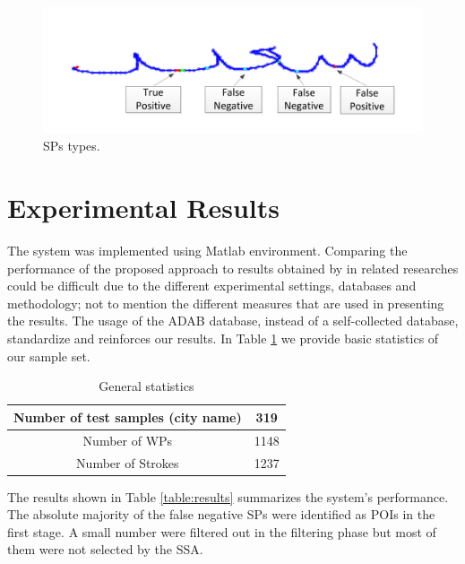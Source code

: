 \documentclass[10pt, conference, compsocconf]{IEEEtran}
\begin{document}
\begin{figure}
\centering
\includegraphics[width=0.8\columnwidth]{./figures/sp_types}
\caption{SPs types.}
\label{fig:sp_types}
\end{figure}

\section{Experimental Results}
\label{sec:results}
The system was implemented using Matlab environment. Comparing the performance of the proposed approach to results obtained by in related researches could be difficult due to the different experimental settings, databases and methodology; not to mention the different measures that are used in presenting the results. The usage of the ADAB database, instead of a self-collected database, standardize and reinforces our results. In Table \ref{table:general_stats} we provide basic statistics of our sample set.

\begin{table}[h]
\caption{General statistics}
\renewcommand{\arraystretch}{1.2}
\begin{tabular}{ | c | c | }
  \hline
  Number of test samples (city name) & 319 \\
  \hline
  Number of WPs & 1148 \\
  \hline
  Number of Strokes & 1237 \\
  \hline
\end{tabular}
\centering
\label{table:general_stats} 
\end{table}

The results shown in Table \ref{table:results} summarizes the system's performance. The absolute majority of the false negative SPs were identified as POIs in the first stage. A small number were filtered out in the filtering phase but most of them were not selected by the SSA.\\
\end{document}
